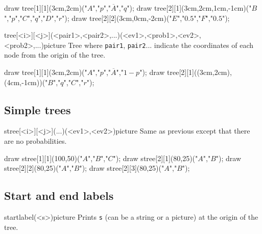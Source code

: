 \documentclass[11pt,a4paper,english]{article}
\begin{document}
\begin{exemple}
draw tree[1][1](3cm,2cm)("$A$","$p$","$\overline{A}$","$q$");
draw tree[2][1](3cm,2cm,1cm,-1cm)("$B$","$p$","$C$","$q$","$D$","$r$");
draw tree[2][2](3cm,0cm,-2cm)("$E$","$0.5$","$F$","$0.5$");
\end{exemple}


\begin{rpobjet}{tree[<i>][<j>](<pair1>,<pair2>,...)(<ev1>,<prob1>,<ev2>,<prob2>,...)}{picture}
Tree where \verb|pair1|, \verb|pair2|... indicate the coordinates of each node from the origin of the tree.
\end{rpobjet}


\begin{exemple}
draw tree[1][1](3cm,2cm)("$A$","$p$","$\overline{A}$","$1-p$");
draw tree[2][1]((3cm,2cm),(4cm,-1cm))("$B$","$q$","$C$","$r$");
\end{exemple}



\subsection{Simple trees}
\begin{rpobjet}{stree[<i>][<j>](...)(<ev1>,<ev2>)}{picture}
Same as previous except that there are no probabilities.
\end{rpobjet}


\begin{exemple}
draw stree[1][1](100,50)("$A$","$B$","$C$");
draw stree[2][1](80,25)("$A$","$B$");
draw stree[2][2](80,25)("$A$","$B$");
draw stree[2][3](80,25)("$A$","$B$");
\end{exemple}

\subsection{Start and end labels}
\begin{rpobjet}{startlabel(<s>)}{picture}
Prints \verb|s| (can be a string or a picture) at the origin of the tree.
\end{rpobjet}
\end{document}
